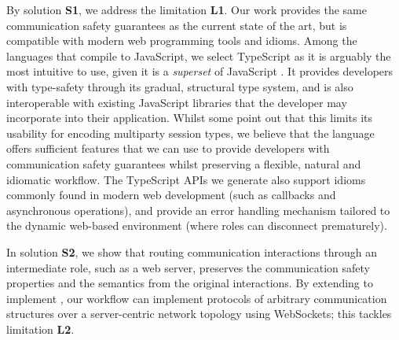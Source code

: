 By solution \textbf{S1}, we address the limitation \textbf{L1}.
Our work provides the same communication safety guarantees
as the current state of the art, but 
is compatible with modern web programming tools and idioms.
Among the languages that compile to JavaScript,
we select TypeScript as it is arguably the most intuitive
to use, given it is a \textit{superset} of JavaScript 
\cite{UnderstandingTypeScript}.
It provides developers
with type-safety through its gradual, structural type system,
and is also interoperable with existing JavaScript libraries
that the developer may incorporate into their application.
Whilst some \cite{MVU2020} point out that 
this limits its usability for
encoding multiparty session types, we believe that the language
offers sufficient features that we can use to provide developers with
communication safety guarantees whilst preserving a flexible, natural
and idiomatic workflow.
The TypeScript APIs we generate also support idioms commonly
found in modern web development (such as callbacks and
asynchronous operations), and provide an error handling
mechanism tailored to the dynamic web-based environment
(where roles can disconnect prematurely).

In solution \textbf{S2},
we show that routing communication interactions through an intermediate
role, such as a web server, preserves the communication
safety properties and the semantics from the original
interactions.
By extending \codegen to implement \newtheory,
our workflow can implement protocols of
arbitrary communication structures over a server-centric
network topology using WebSockets; 
this tackles limitation \textbf{L2}.